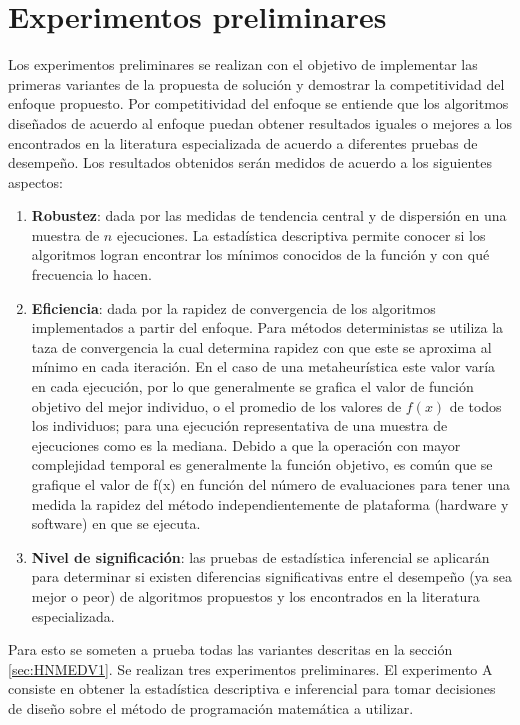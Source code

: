 \section{Experimentos preliminares}
Los experimentos preliminares se realizan con el objetivo de implementar las primeras variantes de la propuesta de solución y demostrar la competitividad del enfoque propuesto. Por competitividad del enfoque se entiende que los algoritmos diseñados de acuerdo al enfoque puedan obtener resultados iguales o mejores a los encontrados en la literatura especializada de acuerdo a diferentes pruebas de desempeño. Los resultados obtenidos serán medidos de acuerdo a los siguientes aspectos:
\begin{enumerate}
	\item \textbf{Robustez}: dada por las medidas de tendencia central y de dispersión en una muestra de $n$ ejecuciones. La estadística descriptiva permite conocer si los algoritmos logran encontrar los mínimos conocidos de la función y con qué frecuencia lo hacen. 
	\item \textbf{Eficiencia}: dada por la rapidez de convergencia de los algoritmos implementados a partir del enfoque. Para métodos deterministas se utiliza la taza de convergencia la cual determina rapidez con que este se aproxima al mínimo en cada iteración. En el caso de una metaheurística este valor varía en cada ejecución, por lo que generalmente se grafica el valor de función objetivo del mejor individuo, o el promedio de los valores de $f(x)$ de todos los individuos; para una ejecución representativa de una muestra de ejecuciones como es la mediana. Debido a que la operación con mayor complejidad temporal es generalmente la función objetivo, es común que se grafique el valor de f(x) en función del número de evaluaciones para tener una medida la rapidez del método independientemente de plataforma (hardware y software) en que se ejecuta.  
	\item \textbf{Nivel de significación}: las pruebas de estadística inferencial se aplicarán para determinar si existen diferencias significativas entre el desempeño (ya sea mejor o peor) de algoritmos propuestos y los encontrados en la literatura especializada.
\end{enumerate}

Para esto se someten a prueba todas las variantes descritas en la sección \ref{sec:HNMEDV1}. Se realizan tres experimentos preliminares. El experimento A  consiste en obtener la estadística descriptiva e inferencial para tomar decisiones de diseño sobre el método de programación matemática a utilizar.

